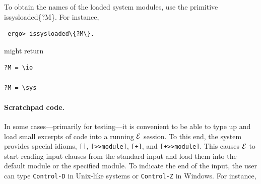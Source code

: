 \documentclass[11pt]{article}
\newcommand{\ERGO}{\mbox{\ensuremath{\cal{E}}\smaller{{\sc{RGO}}}}\xspace}
\newcommand{\FLSYSTEM}{\ERGO}
\newcommand{\comment}[1]{}
\begin{document}
\comment{
The 4-place version of \texttt{isloaded} also leads to
the following very useful idiom. Suppose one has files \texttt{foo}   and
\texttt{bar} in the same directory \texttt{dir}.
The file \texttt{foo} is loaded and it
in turn needs to add \texttt{bar}. One could write something like this:
\begin{alltt}
    \emph{In file foo}:  
           ....
           ?- [+bar].
           ....
\end{alltt}
Unfortunately, this version is not portable because, if \texttt{bar} is a
local name then \texttt{foo} must be loaded when the current directory is
\texttt{dir} --- a serious limitation. Indeed, since \texttt{bar} is a
local name, the add command will not find \texttt{bar} (or will find a
wrong bar), if the current directory is not \texttt{dir}.
Writing \texttt{bar} as an absolute name is even worse. Yes, this will not
be directory-dependent, but only for the author of the above snippet.
Giving this snippet to a different user (who might have a different
directory structure) or moving the snippet, say, from Windows to Linux will
require editing and changing the name each time. It is generally considered
unprofessional (and unacceptable commercially) to depend on full path names.
The \texttt{isloaded} primitive to the rescue:
\begin{verbatim}
    ?- isloaded{?FullFile,\@,\@F,?},
       File[dirname(?FullFile)->?Dir]@\io,
       \symbol[concat([?Dir,bar]) -> ?BarFullName]@\basetype,
       [+?BarFullName].
\end{verbatim}
The remaining ingredients of this recipe are self-explanatory, but look
them up in this manual if they are not.
}

To obtain the names of the loaded system modules, use the primitive
issysloaded\{?M\}. For instance,
\begin{verbatim}
 ergo> issysloaded\{?M\}.
\end{verbatim}
might return
\begin{verbatim}
?M = \io

?M = \sys
\end{verbatim}


\paragraph{Scratchpad code.}
In some cases---primarily for testing---it is convenient to be able to type
up and load small excerpts of code into a running \FLSYSTEM session.
To this end, the system provides special idioms, \verb|[]|,
\verb|[>>module]|, \verb|[+]|, and \verb|[+>>module]|. This causes
\FLSYSTEM to start reading input clauses
from the standard input and load them into the default module or the
specified module. To indicate the end of the input, the user can type
{\tt Control-D} in Unix-like systems or {\tt Control-Z} in Windows.  
For instance,
\end{document}
